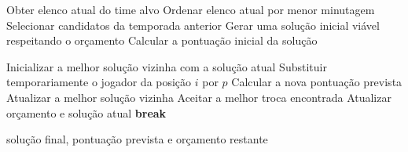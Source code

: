 \begin{algorithm}
\caption{Busca local com estratégia Best Improvement}
\begin{algorithmic}

\State Obter elenco atual do time alvo
\State Ordenar elenco atual por menor minutagem
\State Selecionar candidatos da temporada anterior
\State Gerar uma solução inicial viável respeitando o orçamento
\State Calcular a pontuação inicial da solução

    \State Inicializar a melhor solução vizinha com a solução atual
                \State Substituir temporariamente o jogador da posição $i$ por $p$
                \State Calcular a nova pontuação prevista
                    \State Atualizar a melhor solução vizinha
                \EndIf
            \EndIf
        \EndFor
    \EndFor
        \State Aceitar a melhor troca encontrada
        \State Atualizar orçamento e solução atual
    \Else
        \State \textbf{break}
    \EndIf
\EndWhile

\State \Return solução final, pontuação prevista e orçamento restante

\end{algorithmic}
\end{algorithm}